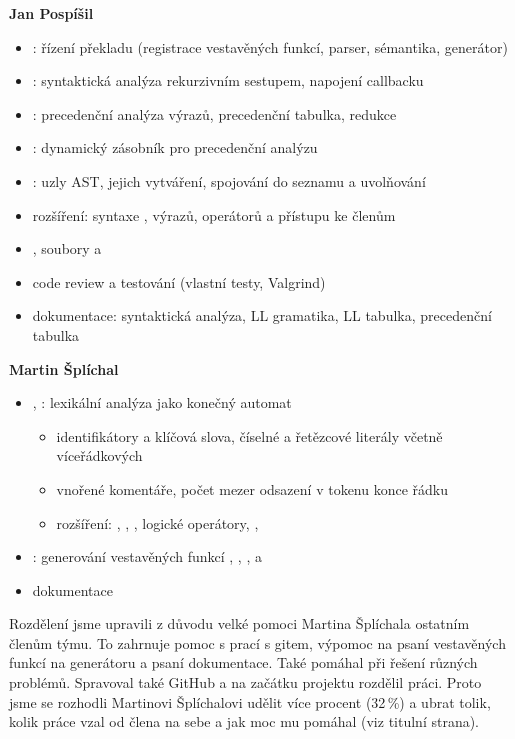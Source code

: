 \documentclass[11pt,a4paper]{article}
\begin{document}
\textbf{Jan Pospíšil}

\begin{itemize}
  \item {}: řízení překladu (registrace vestavěných funkcí, parser, sémantika, generátor)
  \item {}: syntaktická analýza rekurzivním sestupem, napojení callbacku 
  \item {}: precedenční analýza výrazů, precedenční tabulka, redukce
  \item {}: dynamický zásobník pro precedenční analýzu
  \item {}: uzly AST, jejich vytváření, spojování do seznamu a uvolňování
  \item rozšíření: syntaxe ,  výrazů,  operátorů a přístupu ke členům
  \item {}, soubory  a 
  \item code review a testování (vlastní testy, Valgrind)
  \item dokumentace: syntaktická analýza, LL gramatika, LL tabulka, precedenční tabulka
\end{itemize}

\textbf{Martin Šplíchal}

\begin{itemize}
  \item {}, : lexikální analýza jako konečný automat
  \begin{itemize}
    \item identifikátory a klíčová slova, číselné a řetězcové literály včetně víceřádkových
    \item vnořené komentáře, počet mezer odsazení v tokenu konce řádku
    \item rozšíření: , , , logické operátory, , \id{<-}
  \end{itemize}
  \item {}: generování vestavěných funkcí , , ,  a 
  \item dokumentace
\end{itemize}

\newpage

Rozdělení jsme upravili z důvodu velké pomoci Martina Šplíchala ostatním členům
týmu. To zahrnuje pomoc s prací s gitem, výpomoc na psaní vestavěných funkcí
na generátoru a psaní dokumentace. Také pomáhal při řešení různých problémů. Spravoval také GitHub a na začátku projektu rozdělil práci. Proto jsme se rozhodli Martinovi Šplíchalovi
udělit více procent (32\,\%) a ubrat tolik, kolik práce vzal od člena na sebe
a jak moc mu pomáhal (viz titulní strana).
\end{document}
